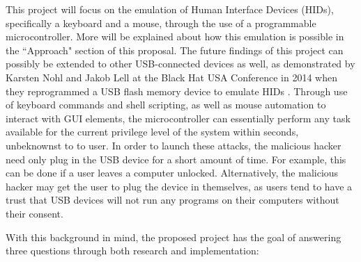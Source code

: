 \documentclass[pagenumbers]{ieee}
\begin{document}
This project will focus on the emulation of Human Interface Devices (HIDs), specifically a keyboard and a mouse, through the use of a programmable microcontroller. More will be explained about how this emulation is possible in the ``Approach" section of this proposal. The future findings of this project can possibly be extended to other USB-connected devices as well, as demonstrated by Karsten Nohl and Jakob Lell at the Black Hat USA Conference in 2014 when they reprogrammed a USB flash memory device to emulate HIDs \cite{nohl}. Through use of keyboard commands and shell scripting, as well as mouse automation to interact with GUI elements, the microcontroller can essentially perform any task available for the current privilege level of the system within seconds, unbeknownst to to user. In order to launch these attacks, the malicious hacker need only plug in the USB device for a short amount of time. For example, this can be done if a user leaves a computer unlocked. Alternatively, the malicious hacker may get the user to plug the device in themselves, as users tend to have a trust that USB devices will not run any programs on their computers without their consent.

With this background in mind, the proposed project has the goal of answering three questions through both research and implementation:
\end{document}
